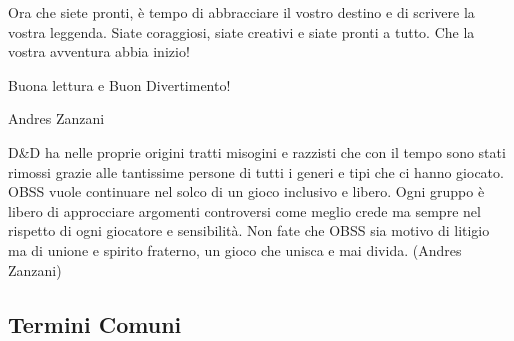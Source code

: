 \begin{multicols}{2}
Ora che siete pronti, è tempo di abbracciare il vostro destino e di scrivere la vostra leggenda. Siate coraggiosi, siate creativi e siate pronti a tutto. Che la vostra avventura abbia inizio!

\begin{center}
Buona lettura e Buon Divertimento!
\end{center}

\begin{flushright}
Andres Zanzani
\end{flushright}

\end{multicols}

\vfill

\begin{changemargin}{0.3cm}{0.3cm}\begin{tcolorbox}
D\&D ha nelle proprie origini tratti misogini e razzisti che con il tempo sono stati rimossi grazie alle tantissime persone di tutti i generi e tipi che ci hanno giocato.
OBSS vuole continuare nel solco di un gioco inclusivo e libero. Ogni gruppo è libero di approcciare argomenti controversi come meglio crede ma sempre nel rispetto di ogni giocatore e sensibilità. Non fate che OBSS sia motivo di litigio ma di unione e spirito fraterno, un gioco che unisca e mai divida. (Andres Zanzani)
\end{tcolorbox}\end{changemargin}

\pagebreak

\subsection{Termini Comuni}\label{Termini Comuni}

